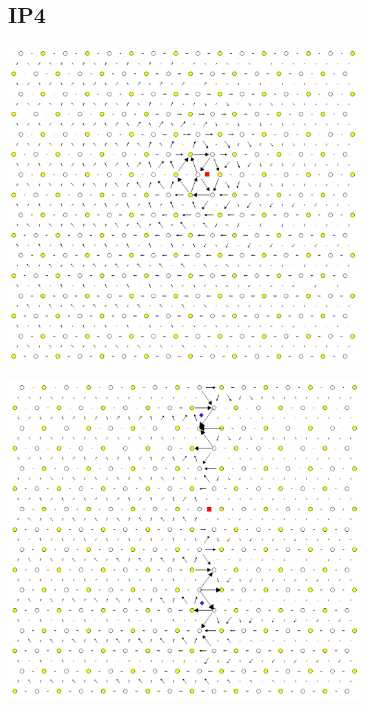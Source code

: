 \documentclass[11pt]{article}
\begin{document}
\subsection{IP4}
\label{sec:org60217c7}
\begin{center}
\includegraphics[width=0.7\textwidth]{Images/final_model_IP4_partial_dd_initial.png}
\end{center}
\begin{center}
\includegraphics[width=0.7\textwidth]{Images/final_model_IP4_partial_dd_final.png}
\end{center}
\end{document}
